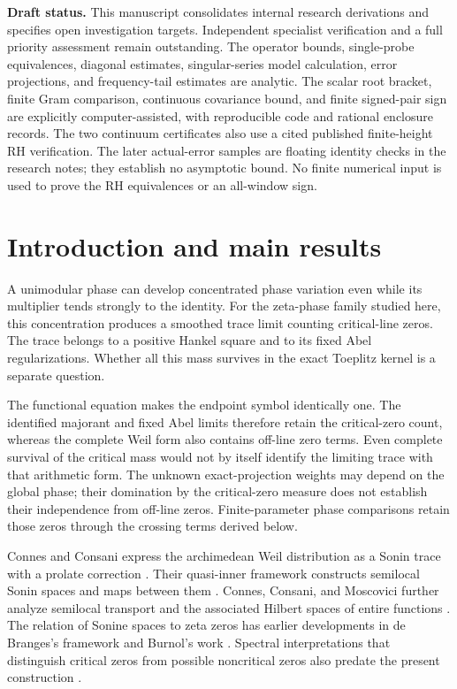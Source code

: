 \documentclass[11pt]{article}
\numberwithin{equation}{section}
\theoremstyle{definition}
\theoremstyle{remark}
\begin{document}
\noindent\textbf{Draft status.}
This manuscript consolidates internal research derivations and specifies
open investigation targets. Independent specialist verification and a
full priority assessment remain outstanding. The operator bounds,
single-probe equivalences, diagonal estimates, singular-series model
calculation, error projections, and frequency-tail estimates are analytic.
The scalar root bracket, finite Gram comparison, continuous covariance
bound, and finite signed-pair sign are explicitly computer-assisted,
with reproducible code and rational enclosure records. The two continuum
certificates also use a cited published finite-height RH verification.
The later actual-error samples are floating identity checks in the
research notes; they establish no asymptotic bound. No finite numerical
input is used to prove the RH equivalences or an all-window sign.

\tableofcontents

\section{Introduction and main results}\label{sec:intro}

A unimodular phase can develop concentrated phase variation even while
its multiplier tends strongly to the identity. For the zeta-phase family
studied here, this concentration produces a smoothed trace limit counting
critical-line zeros. The trace belongs to a positive Hankel square and to
its fixed Abel regularizations. Whether all this mass survives in the
exact Toeplitz kernel is a separate question.

The functional equation makes the endpoint symbol identically one.
The identified majorant and fixed Abel limits therefore retain the
critical-zero count, whereas the complete Weil form also contains
off-line zero terms. Even complete survival of the critical mass would
not by itself identify the limiting trace with that arithmetic form.
The unknown exact-projection weights may depend on the global phase;
their domination by the critical-zero measure does not establish their
independence from off-line zeros. Finite-parameter phase comparisons
retain those zeros through the crossing terms derived below.

Connes and Consani express the archimedean Weil distribution as a Sonin
trace with a prolate correction \cite{CCWeil}. Their quasi-inner framework
constructs semilocal Sonin spaces and maps between them \cite{CCQuasi}.
Connes, Consani, and Moscovici further analyze semilocal transport and
the associated Hilbert spaces of entire functions \cite{CCM}.
The relation of Sonine spaces to zeta zeros has earlier developments
in de Branges's framework and Burnol's work \cite{Burnol}. Spectral
interpretations that distinguish critical zeros from possible noncritical
zeros also predate the present construction \cite{ConnesTrace}.
\end{document}
